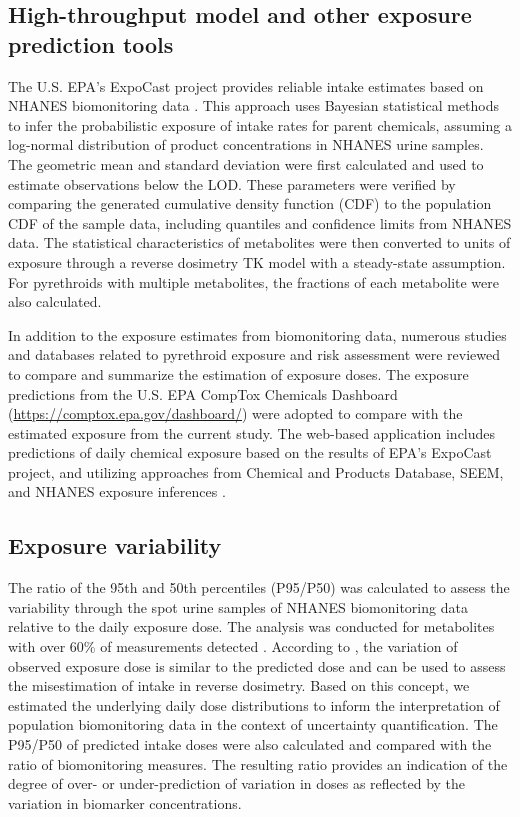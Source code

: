 \documentclass[toxics,article,submit,pdftex,moreauthors]{Definitions/mdpi}
\begin{document}
\subsection{High-throughput model and other exposure prediction
tools}\label{high-throughput-model-and-other-exposure-prediction-tools}

The U.S. EPA's ExpoCast project provides reliable intake estimates based
on NHANES biomonitoring data \citep{wambaugh2013high}. This approach
uses Bayesian statistical methods to infer the probabilistic exposure of
intake rates for parent chemicals, assuming a log-normal distribution of
product concentrations in NHANES urine samples. The geometric mean and
standard deviation were first calculated and used to estimate
observations below the LOD. These parameters were verified by comparing
the generated cumulative density function (CDF) to the population CDF of
the sample data, including quantiles and confidence limits from NHANES
data. The statistical characteristics of metabolites were then converted
to units of exposure through a reverse dosimetry TK model with a
steady-state assumption. For pyrethroids with multiple metabolites, the
fractions of each metabolite were also calculated.

In addition to the exposure estimates from biomonitoring data, numerous
studies and databases related to pyrethroid exposure and risk assessment
were reviewed to compare and summarize the estimation of exposure doses.
The exposure predictions from the U.S. EPA CompTox Chemicals Dashboard
(\url{https://comptox.epa.gov/dashboard/}) were adopted to compare with
the estimated exposure from the current study. The web-based application
includes predictions of daily chemical exposure based on the results of
EPA's ExpoCast project, and utilizing approaches from Chemical and
Products Database, SEEM, and NHANES exposure inferences
\citep{dionisio2018chemical, wambaugh2022exposure}.

\subsection{Exposure variability}\label{exposure-variability}

The ratio of the 95th and 50th percentiles (P95/P50) was calculated to
assess the variability through the spot urine samples of NHANES
biomonitoring data relative to the daily exposure dose. The analysis was
conducted for metabolites with over 60\% of measurements detected
\citep{faure_evaluation_2020}. According to
\citet{aylward_interpreting_2012}, the variation of observed exposure
dose is similar to the predicted dose and can be used to assess the
misestimation of intake in reverse dosimetry. Based on this concept, we
estimated the underlying daily dose distributions to inform the
interpretation of population biomonitoring data in the context of
uncertainty quantification. The P95/P50 of predicted intake doses were
also calculated and compared with the ratio of biomonitoring measures.
The resulting ratio provides an indication of the degree of over- or
under-prediction of variation in doses as reflected by the variation in
biomarker concentrations.
\end{document}
